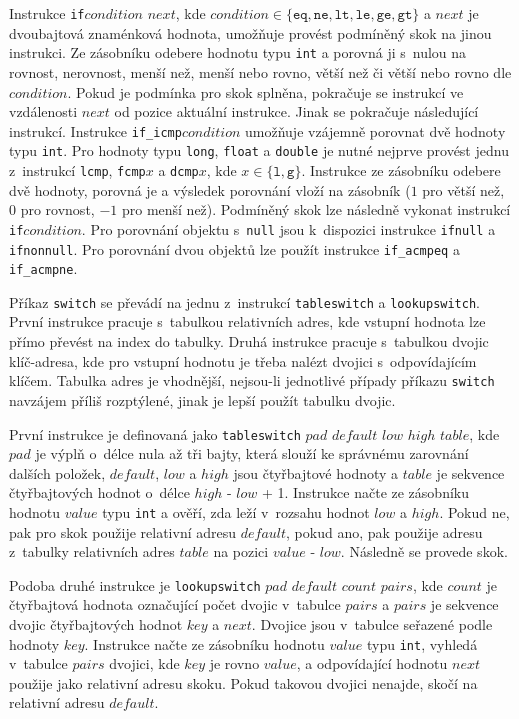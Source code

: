 Instrukce \texttt{if}$condition$ $next$, kde $condition \in \{ \texttt{eq}, \texttt{ne}, \texttt{lt}, \texttt{le}, \texttt{ge}, \texttt{gt}\}$ a $next$ je dvoubajtová znaménková hodnota, umožňuje provést podmíněný skok na jinou instrukci. Ze zásobníku odebere hodnotu typu \texttt{int} a porovná ji s~nulou na rovnost, nerovnost, menší než, menší nebo rovno, větší než či větší nebo rovno dle $condition$. Pokud je podmínka pro skok splněna, pokračuje se instrukcí ve vzdálenosti $next$ od pozice aktuální instrukce. Jinak se pokračuje následující instrukcí. Instrukce \texttt{if\_icmp}$condition$ umožňuje vzájemně porovnat dvě hodnoty typu \texttt{int}.
 Pro hodnoty typu \texttt{long}, \texttt{float} a \texttt{double} je nutné nejprve provést jednu z~instrukcí \texttt{lcmp}, \texttt{fcmp}$x$ a \texttt{dcmp}$x$, kde $x \in \{\texttt{l}, \texttt{g} \}$. Instrukce ze zásobníku odebere dvě hodnoty, porovná je a výsledek porovnání vloží na zásobník ($1$ pro větší než, $0$ pro rovnost, $-1$ pro menší než). Podmíněný skok lze následně vykonat instrukcí \texttt{if}$condition$.
Pro porovnání objektu s~\texttt{null} jsou k~dispozici instrukce \texttt{ifnull} a \texttt{ifnonnull}. Pro porovnání dvou objektů lze použít instrukce \texttt{if\_acmpeq} a \texttt{if\_acmpne}.

Příkaz \texttt{switch} se převádí na jednu z~instrukcí \texttt{tableswitch} a \texttt{lookupswitch}. První instrukce pracuje s~tabulkou relativních adres, kde vstupní hodnota lze přímo převést na index do tabulky. Druhá instrukce pracuje s~tabulkou dvojic klíč-adresa, kde pro vstupní hodnotu je třeba nalézt dvojici s~odpovídajícím klíčem. Tabulka adres je vhodnější, nejsou-li jednotlivé případy příkazu \texttt{switch} navzájem příliš rozptýlené, jinak je lepší použít tabulku dvojic.

První instrukce je definovaná jako \texttt{tableswitch} $pad$ $default$ $low$ $high$ $table$, kde $pad$ je výplň o~délce nula až tři bajty, která slouží ke správnému zarovnání dalších položek, $default$, $low$ a $high$ jsou čtyřbajtové hodnoty a $table$ je sekvence čtyřbajtových hodnot o~délce $high$ - $low$ + 1. Instrukce načte ze zásobníku hodnotu $value$ typu \texttt{int} a ověří, zda leží v~rozsahu hodnot $low$ a $high$. Pokud ne, pak pro skok použije relativní adresu $default$, pokud ano, pak použije adresu z~tabulky relativních adres $table$ na pozici $value$ - $low$. Následně se provede skok.

Podoba druhé instrukce je \texttt{lookupswitch} $pad$ $default$ $count$ $pairs$, kde $count$ je čtyřbajtová hodnota označující počet dvojic v~tabulce $pairs$ a $pairs$ je sekvence dvojic čtyřbajtových hodnot $key$ a $next$. Dvojice jsou v~tabulce seřazené podle hodnoty $key$. Instrukce načte ze zásobníku hodnotu $value$ typu \texttt{int}, vyhledá v~tabulce $pairs$ dvojici, kde $key$ je rovno $value$, a odpovídající hodnotu $next$ použije jako relativní adresu skoku. Pokud takovou dvojici nenajde, skočí na relativní adresu $default$.

